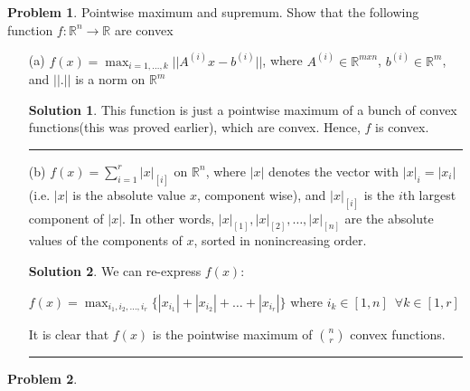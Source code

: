 \documentclass{article}
\theoremstyle{definition}
\newtheorem{problem}{Problem}
\def\fline{\rule{0.75\linewidth}{0.5pt}}
\newcommand{\finishline}{\begin{center}\fline\end{center}}
\newtheorem*{solution*}{Solution}
\newenvironment{solution}{\begin{solution*}}{{\finishline} \end{solution*}}
\begin{document}
\begin{problem}
    {Pointwise maximum and supremum.} Show that the following function $f: \mathbb{R}^n \rightarrow \mathbb{R}$ are convex

    \begin{itemize}
        \item[(a)] $f(x) = \max_{i = 1, \dots, k} || A^{(i)}x - b^{(i)}||$, where $A^{(i)} \in \mathbb{R}^{m x n}$, $b^{(i)} \in \mathbb{R}^m$, and $||.||$ is a norm on $\mathbb{R}^m$

        \begin{solution}
            This function is just a pointwise maximum of a bunch of convex functions(this was proved earlier), which are convex. Hence, $f$ is convex. 
        \end{solution}

        \item[(b)] $f(x) = \sum_{i=1}^{r} |x|_{[i]}$ on $\mathbb{R}^n$, where $|x|$ denotes the vector with $|x|_i = |x_i|$ (i.e. $|x|$ is the absolute value $x$, component wise), and $|x|_{[i]}$ is the $i$th largest component of $|x|$.  In other words,  $|x|_{[1]}, |x|_{[2]}, \dots , |x|_{[n]}$ are the absolute values of the components of $x$, sorted in nonincreasing order.

        \begin{solution}
            We can re-express $f(x)$: \newline 

            $f(x) = \max_{i_1, i_2, \dots, i_r} \{|x_{i_1}| + |x_{i_2}| + \dots + |x_{i_r}|\}$ where $i_k \in [1, n] \enspace \forall k \in [1, r]$ \newline 

            It is clear that $f(x)$ is the pointwise maximum of $\binom{n}{r}$ convex functions. 

            
        \end{solution}
    \end{itemize}
\end{problem}


\begin{problem}
    
\end{problem}
\end{document}
